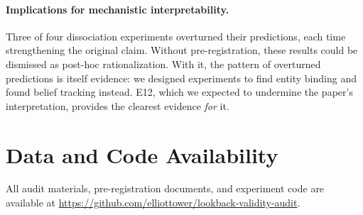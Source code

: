 \documentclass{article}
\begin{document}
\paragraph{Implications for mechanistic interpretability.}
Three of four dissociation experiments overturned their predictions, each time strengthening the original claim. Without pre-registration, these results could be dismissed as post-hoc rationalization. With it, the pattern of overturned predictions is itself evidence: we designed experiments to find entity binding and found belief tracking instead. E12, which we expected to undermine the paper's interpretation, provides the clearest evidence \emph{for} it.


\section*{Data and Code Availability}

All audit materials, pre-registration documents, and experiment code are available at \url{https://github.com/elliottower/lookback-validity-audit}.



\end{document}
